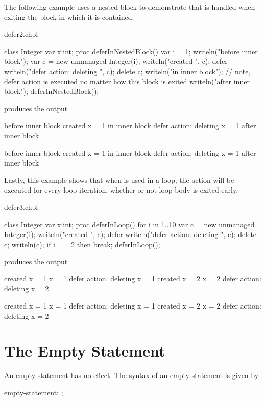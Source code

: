 The following example uses a nested block to demonstrate that 
is handled when exiting the block in which it is contained:


\begin{chapelexample}{defer2.chpl}
\begin{chapel}
class Integer {
  var x:int;
}
proc deferInNestedBlock() {
  var i = 1;
  writeln("before inner block");
  {
    var c = new unmanaged Integer(i);
    writeln("created ", c);
    defer {
      writeln("defer action: deleting ", c);
      delete c;
    }
    writeln("in inner block");
    // note, defer action is executed no matter how this block is exited
  }
  writeln("after inner block");
}
deferInNestedBlock();
\end{chapel}
produces the output
\begin{chapeloutput}
before inner block
created {x = 1}
in inner block
defer action: deleting {x = 1}
after inner block
\end{chapeloutput}
\begin{commandline}
before inner block
created {x = 1}
in inner block
defer action: deleting {x = 1}
after inner block
\end{commandline}

\end{chapelexample}

Lastly, this example shows that when  is used in a loop, the
action will be executed for every loop iteration, whether or not loop
body is exited early.

\begin{chapelexample}{defer3.chpl}
\begin{chapel}
class Integer {
  var x:int;
}
proc deferInLoop() {
  for i in 1..10 {
    var c = new unmanaged Integer(i);
    writeln("created ", c);
    defer {
      writeln("defer action: deleting ", c);
      delete c;
    }
    writeln(c);
    if i == 2 then
      break;
  }
}
deferInLoop();
\end{chapel}
produces the output
\begin{chapeloutput}
created {x = 1}
{x = 1}
defer action: deleting {x = 1}
created {x = 2}
{x = 2}
defer action: deleting {x = 2}
\end{chapeloutput}
\begin{commandline}
created {x = 1}
{x = 1}
defer action: deleting {x = 1}
created {x = 2}
{x = 2}
defer action: deleting {x = 2}
\end{commandline}
\end{chapelexample}


\section{The Empty Statement}
\label{The_Empty_Statement}

An empty statement has no effect.  The syntax of an empty statement is
given by
\begin{syntax}
empty-statement:
  ;
\end{syntax}
